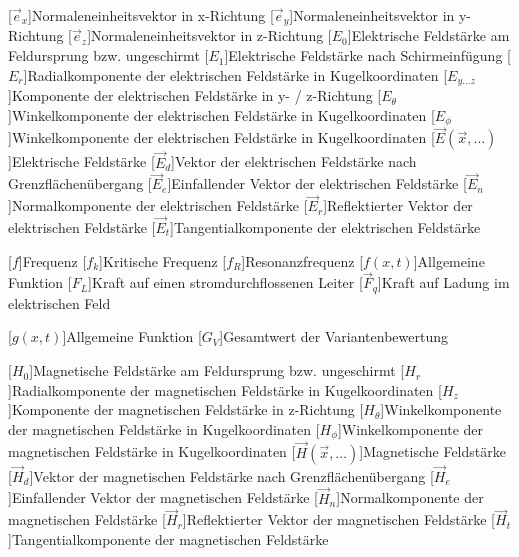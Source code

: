 \begin{acronym}[Platzhalterwort]
[$\vec e_x$]{Normaleneinheitsvektor in x-Richtung}
[$\vec e_y$]{Normaleneinheitsvektor in y-Richtung}
[$\vec e_z$]{Normaleneinheitsvektor in z-Richtung}
[$E_0$]{\acrounit{\volt\per\meter}Elektrische Feldstärke am Feldursprung bzw. ungeschirmt}
[$E_1$]{\acrounit{\volt\per\meter}Elektrische Feldstärke nach Schirmeinfügung}
[$E_r$]{\acrounit{\volt\per\meter}Radialkomponente der elektrischen Feldstärke in Kugelkoordinaten}
[$E_{y\ldots z}$]{\acrounit{\volt\per\meter}Komponente der elektrischen Feldstärke in y- / z-Richtung}
[$E_{\theta}$]{\acrounit{\volt\per\meter}Winkelkomponente der elektrischen Feldstärke in Kugelkoordinaten}
[$E_{\phi}$]{\acrounit{\volt\per\meter}Winkelkomponente der elektrischen Feldstärke in Kugelkoordinaten}
[$\vec E(\vec x, \ldots)$]{\acrounit{\volt\per\meter}Elektrische Feldstärke}
[$\vec E_d$]{\acrounit{\volt\per\meter}Vektor der elektrischen Feldstärke nach Grenzflächenübergang}
[$\vec E_e$]{\acrounit{\volt\per\meter}Einfallender Vektor der elektrischen Feldstärke}
[$\vec E_n$]{\acrounit{\volt\per\meter}Normalkomponente der elektrischen Feldstärke}
[$\vec E_r$]{\acrounit{\volt\per\meter}Reflektierter Vektor der elektrischen Feldstärke}
[$\vec E_t$]{\acrounit{\volt\per\meter}Tangentialkomponente der elektrischen Feldstärke}


[$f$]{\acrounit{\hertz}Frequenz}
[$f_k$]{\acrounit{\hertz}Kritische Frequenz}
[$f_R$]{\acrounit{\hertz}Resonanzfrequenz}
[$f(x,t)$]{\acrounit{-}Allgemeine Funktion}
[$F_L$]{\acrounit{\newton}Kraft auf einen stromdurchflossenen Leiter}
[$\vec F_q$]{\acrounit{\newton}Kraft auf Ladung im elektrischen Feld}

[$g(x,t)$]{\acrounit{-}Allgemeine Funktion}
[$G_V$]{\acrounit{-}Gesamtwert der Variantenbewertung}

[$H_0$]{\acrounit{\ampere\per\meter}Magnetische Feldstärke am Feldursprung bzw. ungeschirmt}
[$H_r$]{\acrounit{\ampere\per\meter}Radialkomponente der magnetischen Feldstärke in Kugelkoordinaten}
[$H_z$]{\acrounit{\ampere\per\meter}Komponente der magnetischen Feldstärke in z-Richtung}
[$H_{\theta}$]{\acrounit{\ampere\per\meter}Winkelkomponente der magnetischen Feldstärke in Kugelkoordinaten}
[$H_{\phi}$]{\acrounit{\ampere\per\meter}Winkelkomponente der magnetischen Feldstärke in Kugelkoordinaten}
[$\vec H(\vec x, \ldots)$]{\acrounit{\ampere\per\meter}Magnetische Feldstärke}
[$\vec H_d$]{\acrounit{\ampere\per\meter}Vektor der magnetischen Feldstärke nach Grenzflächenübergang}
[$\vec H_e$]{\acrounit{\ampere\per\meter}Einfallender Vektor der magnetischen Feldstärke}
[$\vec H_n$]{\acrounit{\ampere\per\meter}Normalkomponente der magnetischen Feldstärke}
[$\vec H_r$]{\acrounit{\ampere\per\meter}Reflektierter Vektor der magnetischen Feldstärke}
[$\vec H_t$]{\acrounit{\ampere\per\meter}Tangentialkomponente der magnetischen Feldstärke}



\end{acronym}
